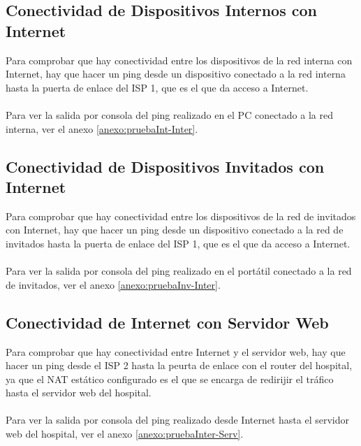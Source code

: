 \subsection{Conectividad de Dispositivos Internos con Internet}\label{subsec:ConHaciInt}
Para comprobar que hay conectividad entre los dispositivos de la red interna con Internet, hay que hacer un ping desde un dispositivo conectado a la red interna hasta la puerta de enlace del ISP 1, 
que es el que da acceso a Internet. 
\\ \\
Para ver la salida por consola del ping realizado en el PC conectado a la red interna, ver el anexo \ref{anexo:pruebaInt-Inter}.

\subsection{Conectividad de Dispositivos Invitados con Internet}
Para comprobar que hay conectividad entre los dispositivos de la red de invitados con Internet, hay que hacer un ping desde un dispositivo conectado a la red de invitados hasta la puerta de enlace del ISP 1, 
que es el que da acceso a Internet. 
\\ \\
Para ver la salida por consola del ping realizado en el portátil conectado a la red de invitados, ver el anexo \ref{anexo:pruebaInv-Inter}.

\subsection{Conectividad de Internet con Servidor Web}\label{subsec:ConDesdeInt}
Para comprobar que hay conectividad entre Internet y el servidor web, hay que hacer un ping desde el ISP 2 hasta la peurta de enlace con el router del hospital, ya que el NAT estático configurado es el que se encarga de redirijir el tráfico hasta el servidor web del hospital.
\\ \\
Para ver la salida por consola del ping realizado desde Internet hasta el servidor web del hospital, ver el anexo \ref{anexo:pruebaInter-Serv}.

